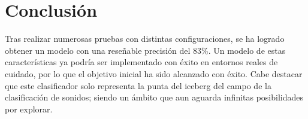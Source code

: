 
\section{Conclusión}
Tras realizar numerosas pruebas con distintas
configuraciones, se ha logrado obtener un modelo con una
reseñable precisión del 83\%.
Un modelo de estas características ya podría ser
implementado con éxito en entornos reales de cuidado, por lo
que el objetivo inicial ha sido alcanzado con éxito.
Cabe destacar que este clasificador solo representa la punta
del iceberg del campo de la clasificación de sonidos; siendo
un ámbito que aun aguarda infinitas posibilidades por
explorar.
